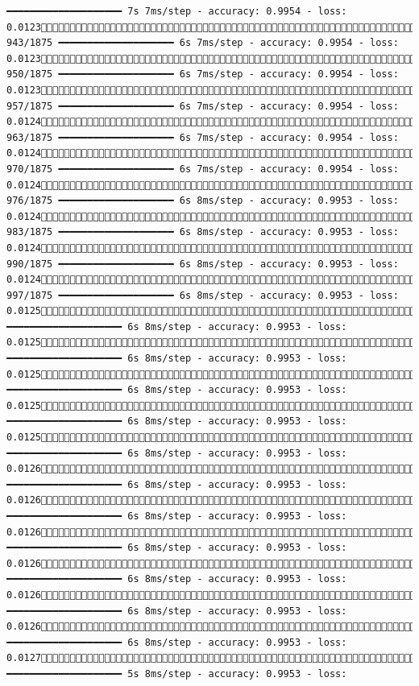 \documentclass[
  letterpaper,
  DIV=11,
  numbers=noendperiod]{scrreprt}
\begin{document}
\begin{verbatim}
━━━━━━━━━━━━━━━━━━━━ 7s 7ms/step - accuracy: 0.9954 - loss: 0.0123 943/1875 ━━━━━━━━━━━━━━━━━━━━ 6s 7ms/step - accuracy: 0.9954 - loss: 0.0123 950/1875 ━━━━━━━━━━━━━━━━━━━━ 6s 7ms/step - accuracy: 0.9954 - loss: 0.0123 957/1875 ━━━━━━━━━━━━━━━━━━━━ 6s 7ms/step - accuracy: 0.9954 - loss: 0.0124 963/1875 ━━━━━━━━━━━━━━━━━━━━ 6s 7ms/step - accuracy: 0.9954 - loss: 0.0124 970/1875 ━━━━━━━━━━━━━━━━━━━━ 6s 7ms/step - accuracy: 0.9954 - loss: 0.0124 976/1875 ━━━━━━━━━━━━━━━━━━━━ 6s 8ms/step - accuracy: 0.9953 - loss: 0.0124 983/1875 ━━━━━━━━━━━━━━━━━━━━ 6s 8ms/step - accuracy: 0.9953 - loss: 0.0124 990/1875 ━━━━━━━━━━━━━━━━━━━━ 6s 8ms/step - accuracy: 0.9953 - loss: 0.0124 997/1875 ━━━━━━━━━━━━━━━━━━━━ 6s 8ms/step - accuracy: 0.9953 - loss: 0.01251004/1875 ━━━━━━━━━━━━━━━━━━━━ 6s 8ms/step - accuracy: 0.9953 - loss: 0.01251010/1875 ━━━━━━━━━━━━━━━━━━━━ 6s 8ms/step - accuracy: 0.9953 - loss: 0.01251017/1875 ━━━━━━━━━━━━━━━━━━━━ 6s 8ms/step - accuracy: 0.9953 - loss: 0.01251025/1875 ━━━━━━━━━━━━━━━━━━━━ 6s 8ms/step - accuracy: 0.9953 - loss: 0.01251032/1875 ━━━━━━━━━━━━━━━━━━━━ 6s 8ms/step - accuracy: 0.9953 - loss: 0.01261039/1875 ━━━━━━━━━━━━━━━━━━━━ 6s 8ms/step - accuracy: 0.9953 - loss: 0.01261047/1875 ━━━━━━━━━━━━━━━━━━━━ 6s 8ms/step - accuracy: 0.9953 - loss: 0.01261054/1875 ━━━━━━━━━━━━━━━━━━━━ 6s 8ms/step - accuracy: 0.9953 - loss: 0.01261062/1875 ━━━━━━━━━━━━━━━━━━━━ 6s 8ms/step - accuracy: 0.9953 - loss: 0.01261069/1875 ━━━━━━━━━━━━━━━━━━━━ 6s 8ms/step - accuracy: 0.9953 - loss: 0.01261076/1875 ━━━━━━━━━━━━━━━━━━━━ 6s 8ms/step - accuracy: 0.9953 - loss: 0.01271084/1875 ━━━━━━━━━━━━━━━━━━━━ 5s 8ms/step - accuracy: 0.9953 - loss: 
\end{verbatim}
\end{document}
